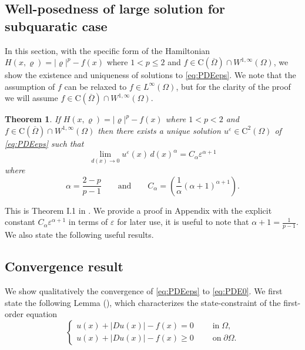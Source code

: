 \documentclass[11pt,reqno]{amsart}
\numberwithin{figure}{section}
\theoremstyle{plain}
\newtheorem{thm}{Theorem}[section]
\theoremstyle{remark}
\numberwithin{equation}{section}
\begin{document}
\subsection{Well-posedness of large solution for subquaratic case} In this section, with the specific form of the Hamiltonian $H(x,\varrho) = |\varrho|^p - f(x)$ where $1<p\leq 2$ and $f\in \mathrm{C}(\overline{\Omega})\cap W^{1,\infty}(\Omega)$, we show the existence and uniqueness of solutions to \eqref{eq:PDEeps}. 
We note that the assumption of $f$ can be relaxed to $f\in L^\infty(\Omega)$, but for the clarity of the proof we will assume $f\in \mathrm{C}(\overline{\Omega})\cap W^{1,\infty}(\Omega)$.

\begin{thm}\label{thm:wellposed1<p<2} If $H(x,\varrho) = |\varrho|^p - f(x)$ where $1<p< 2$ and $f\in \mathrm{C}(\overline{\Omega})\cap W^{1,\infty}(\Omega)$ then there exists a unique solution $u^\varepsilon\in \mathrm{C}^2(\Omega)$ of \eqref{eq:PDEeps} such that
\begin{equation*}
    \lim_{d(x)\to 0} u^\varepsilon(x) \,d(x)^\alpha = C_\alpha \varepsilon^{\alpha+1}
\end{equation*}
where
\begin{equation*}
    \displaystyle\alpha = \frac{2-p}{p-1} \qquad\text{and}\qquad C_\alpha = \left(\frac{1}{\alpha}(\alpha+1)^{\alpha+1}\right).
\end{equation*}
\end{thm}
\noindent This is Theorem I.1 in \cite{Lasry1989}. We provide a proof in Appendix with the explicit constant $C_\alpha\varepsilon^{\alpha+1}$ in terms of $\varepsilon$ for later use, it is useful to note that $\alpha+1 = \frac{1}{p-1}$. We also state the following useful results.


\subsection{Convergence result} We show qualitatively the convergence of \eqref{eq:PDEeps} to \eqref{eq:PDE0}. We first state the following Lemma (\cite{Capuzzo-Dolcetta1990}), which characterizes the state-constraint of the first-order equation
\begin{equation}\label{S_0}
\begin{cases}
       u(x) + |Du(x)| - f(x) = 0\;\qquad\text{in}\;\Omega,\\
       u(x) + |Du(x)| - f(x) \geq 0\;\qquad\text{on}\;\partial\Omega. 
\end{cases}\tag{$S_0$}   
\end{equation}
\end{document}
